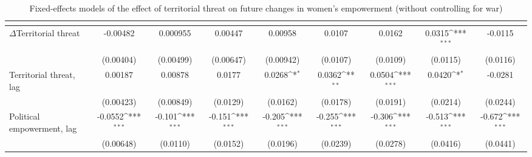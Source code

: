 \begin{table}[htbp]\centering
\def\sym#1{\ifmmode^{#1}\else\(^{#1}\)\fi}
\caption{Fixed-effects models of the effect of territorial threat on future changes in women's empowerment (without controlling for war) \label{fepolempnowar}}
\begin{tabular}{l*{8}{c}}
\hline\hline
                    &&&&&&&&\\
\hline
$\Delta$Territorial threat       &    -0.00482         &    0.000955         &     0.00447         &     0.00958         &      0.0107         &      0.0162         &      0.0315\sym{***}&     -0.0115         \\
                    &   (0.00404)         &   (0.00499)         &   (0.00647)         &   (0.00942)         &    (0.0107)         &    (0.0109)         &    (0.0115)         &    (0.0116)         \\
[1em]
Territorial threat, lag       &     0.00187         &     0.00878         &      0.0177         &      0.0268\sym{*}  &      0.0362\sym{**} &      0.0504\sym{***}&      0.0420\sym{*}  &     -0.0281         \\
                    &   (0.00423)         &   (0.00849)         &    (0.0129)         &    (0.0162)         &    (0.0178)         &    (0.0191)         &    (0.0214)         &    (0.0244)         \\
[1em]
Political empowerment, lag    &     -0.0552\sym{***}&      -0.101\sym{***}&      -0.151\sym{***}&      -0.205\sym{***}&      -0.255\sym{***}&      -0.306\sym{***}&      -0.513\sym{***}&      -0.672\sym{***}\\
                    &   (0.00648)         &    (0.0110)         &    (0.0152)         &    (0.0196)         &    (0.0239)         &    (0.0278)         &    (0.0416)         &    (0.0441)         \\

\end{tabular}
\end{table}
